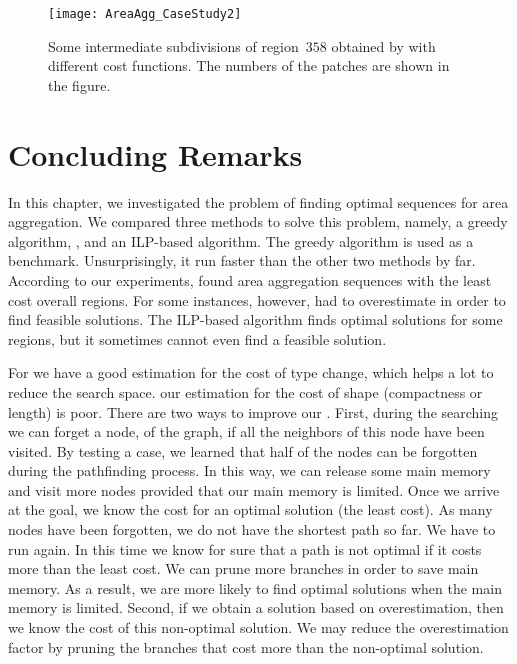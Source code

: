 \begin{figure}[tb]
	\centering
	\texttt{[image: AreaAgg\_CaseStudy2]}
	\caption{Some intermediate subdivisions of region~$358$ 
		obtained by \Astar with different cost functions.
		The numbers of the patches are shown in the figure.
	}
	\label{fig:AreaAgg_CaseStudy2_Rg358}
\end{figure}


\section{Concluding Remarks}
\label{sec:AreaAgg_Conclusions}
In this chapter, we investigated the problem of 
finding optimal sequences for area aggregation.
We compared three methods to solve this problem, namely, 
a greedy algorithm, \Astar, and an ILP-based algorithm.
The greedy algorithm is used as a benchmark.
Unsurprisingly, it run faster than the other two methods by far.
According to our experiments, \Astar found area aggregation sequences
with the least cost overall regions.
For some instances, however, \Astar had to overestimate
in order to find feasible solutions.
The ILP-based algorithm finds optimal solutions for some regions,
but it sometimes cannot even find a feasible solution.


For \Astar we have a good estimation for the cost of type change, which helps a lot to reduce the search space. 
our estimation for the cost of shape (compactness or length) is poor.
There are two ways to improve our \Astar.
First, during the searching we can forget a node, of the graph,
if all the neighbors of this node have been visited.
By testing a case, we learned that half of the nodes can be 
forgotten during the pathfinding process.
In this way, we can release some main memory and visit more nodes
provided that our main memory is limited.
Once we arrive at the goal, we know the cost for an optimal solution
(the least cost).
As many nodes have been forgotten, we do not have the shortest path so far.
We have to run \Astar again.
In this time we know for sure that 
a path is not optimal 
if it costs more than the least cost.
We can prune more branches in order to save main memory.
As a result, we are more likely to find optimal solutions
when the main memory is limited.
Second, if we obtain a solution based on overestimation, 
then we know the cost of this non-optimal solution.
We may reduce the overestimation factor by pruning the branches
that cost more than the non-optimal solution.

